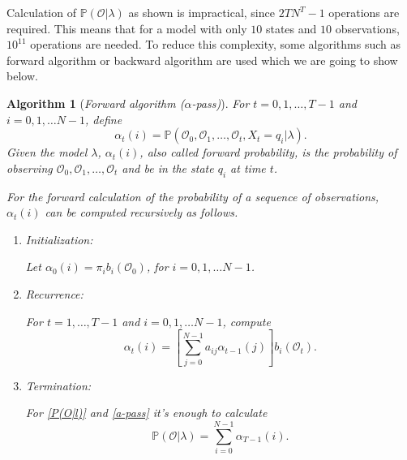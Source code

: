 \documentclass[12pt]{article}
\newtheorem{algorithm2}{Algorithm}
\def\OO{\mathcal{O}}
\def\PP{\mathbb{P}}
\numberwithin{equation}{section}
\begin{document}
Calculation of $\PP(\OO|\lambda)$ as shown is impractical, since $2TN^{T}-1$ operations are required. This means that for a model with only $10$ states and $10$ observations, $10^{11}$ operations are needed. To reduce this complexity, some algorithms such as forward algorithm or backward algorithm are used which we are going to show below.

\begin{algorithm2}[\emph{Forward algorithm (}$\alpha$\emph{-pass)}]\label{a-pass algorithm}
\normalfont For $t = 0,1, \dots, T-1$ and $i = 0,1, \dots N-1$, define
\begin{equation}\label{a-pass}
    \alpha_{t}(i) = \PP(\OO_{0}, \OO_{1}, \dots, \OO_{t}, X_{t} = q_{i} | \lambda).
\end{equation}
Given the model $\lambda$, $\alpha_{t}(i)$, also called \emph{forward probability}, is the probability of observing $\OO_{0}, \OO_{1}, \dots, \OO_{t}$ and be in the state $q_{i}$ at time $t$.

For the forward calculation of the probability of a sequence of observations, $\alpha_{t}(i)$ can be computed recursively as follows.
\begin{enumerate}
    \item Initialization:

    Let $\alpha_{0}(i) = \pi_{i} b_{i}(\OO_{0})$, for $i = 0,1, \dots N-1$.

    \item Recurrence:

    For $t = 1, \dots, T-1$ and $i = 0,1, \dots N-1$, compute
    \[\alpha_{t}(i) = \left[ \sum_{j=0}^{N-1}a_{ij} \alpha_{t-1}(j) \right] b_{i}(\OO_{t}).\]

    \item Termination:

    For \ref{P(O|l)} and \ref{a-pass} it's enough to calculate
    \[\PP(\OO|\lambda) = \sum_{i=0}^{N-1}\alpha_{T-1}(i).\]
\end{enumerate}
\end{algorithm2}
\end{document}
